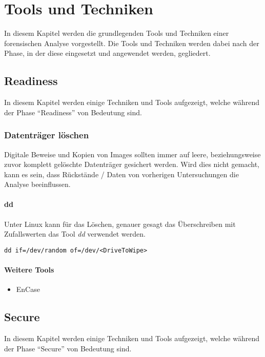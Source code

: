 \chapter{Tools und Techniken} \label{chap:ToolsTechniques}
In diesem Kapitel werden die grundlegenden Tools und Techniken einer forensischen Analyse vorgestellt. Die Tools und Techniken werden dabei nach der Phase, in der diese eingesetzt und angewendet werden, gegliedert.




\section{Readiness}
In diesem Kapitel werden einige Techniken und Tools aufgezeigt, welche während der Phase "`Readiness"' von Bedeutung sind.


\subsection{Datenträger löschen}
Digitale Beweise und Kopien von Images sollten immer auf leere, beziehungsweise zuvor komplett gelöschte Datenträger gesichert werden. Wird dies nicht gemacht, kann es sein, dass Rückstände / Daten von vorherigen Untersuchungen die Analyse beeinflussen.

\subsubsection{dd}
Unter Linux kann für das Löschen, genauer gesagt das Überschreiben mit Zufallswerten das Tool \textit{dd} verwendet werden.

\begin{lstlisting}
dd if=/dev/random of=/dev/<DriveToWipe>
\end{lstlisting}

\subsubsection{Weitere Tools}
\begin{itemize}
\item EnCase
\end{itemize}




\section{Secure}
In diesem Kapitel werden einige Techniken und Tools aufgezeigt, welche während der Phase "`Secure"' von Bedeutung sind. 


